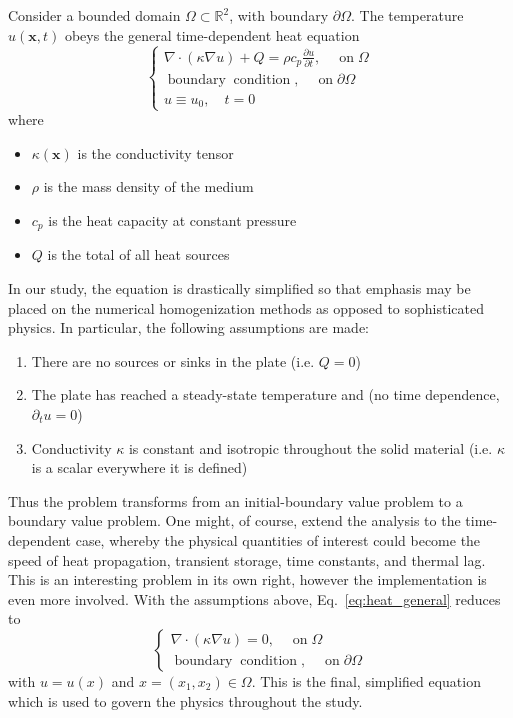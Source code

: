 \documentclass{article}
\newcommand{\tmmathbf}[1]{\ensuremath{\boldsymbol{#1}}}
\newcommand{\tmop}[1]{\ensuremath{\operatorname{#1}}}
\newenvironment{enumeratenumeric}{\begin{enumerate}[1.] }{\end{enumerate}}
\begin{document}
Consider a bounded domain $\Omega \subset \mathbb{R}^2 $, with boundary
$\partial \Omega$. The temperature $u (\tmmathbf{x}, t)$ obeys the general
time-dependent heat equation
\begin{equation}
  \label{eq:heat_general}
  \left\{ \begin{array}{c}
    \nabla \cdot (\kappa \nabla u) + Q = \rho c_p \frac{\partial u}{\partial
    t}, \quad \tmop{on} \Omega\\
    \tmop{boundary} \tmop{condition}, \quad \tmop{on} \partial \Omega \\
    u\equiv u_0, \quad t=0
  \end{array} \right.
\end{equation}
where
\begin{itemize}
  \item $\kappa (\tmmathbf{x})$ is the conductivity tensor
  
  \item $\rho$ is the mass density of the medium
  
  \item $c_p$ is the heat capacity at constant pressure
  
  \item $Q$ is the total of all heat sources
\end{itemize}
In our study, the equation is drastically simplified so that emphasis may be
placed on the numerical homogenization methods as opposed to sophisticated physics.
In particular, the following assumptions are made:
\begin{enumeratenumeric}
  \item There are no sources or sinks in the plate (i.e. $Q = 0$)
  
  \item The plate has reached a steady-state temperature and (no time dependence,
  $\partial_t u = 0$)
  
  \item Conductivity $\kappa$ is constant and isotropic throughout the solid
  material (i.e. $\kappa$ is a scalar everywhere it is defined)
\end{enumeratenumeric}
Thus the problem transforms from an initial-boundary value problem to a boundary value problem. One might, of course, extend the analysis to the time-dependent case, whereby
the physical quantities of interest could become the speed of heat
propagation, transient storage, time constants, and thermal lag. This is an
interesting problem in its own right, however the implementation is even more
involved. With the assumptions above, Eq.~\eqref{eq:heat_general} reduces to
\begin{equation}
  \label{eq:heat_steady}
  \left\{ \begin{array}{c}
    \nabla \cdot (\kappa \nabla u) = 0, \quad \tmop{on} \Omega\\
    \tmop{boundary} \tmop{condition}, \quad \tmop{on} \partial \Omega
  \end{array} \right.
\end{equation}
with $u = u (x)$ and $x = (x_1, x_2) \in \Omega$. This is the final, simplified equation which is used to
govern the physics throughout the study.
\end{document}
